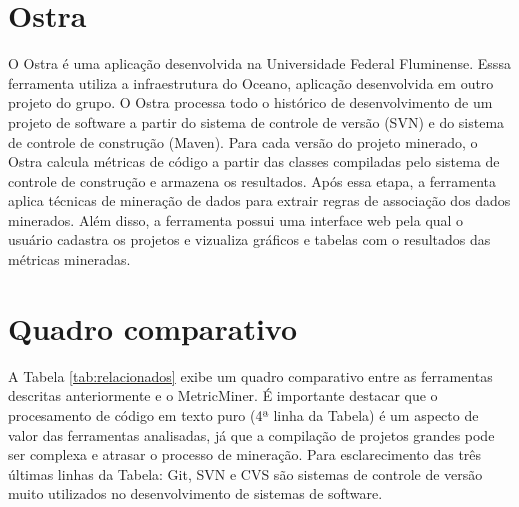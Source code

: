 \documentclass[a4paper, 12pt, twoside]{book}
\begin{document}
\section*{Ostra}
    O Ostra \cite{oceano} é uma aplicação desenvolvida na Universidade Federal Fluminense. Esssa ferramenta utiliza a infraestrutura do Oceano, aplicação desenvolvida em outro projeto do grupo. O Ostra processa todo o histórico de desenvolvimento de um projeto de software a partir do sistema de controle de versão (SVN) e do sistema de controle de construção (Maven). Para cada versão do projeto minerado, o Ostra calcula métricas de código a partir das classes compiladas pelo sistema de controle de construção e armazena os resultados. Após essa etapa, a ferramenta aplica técnicas de mineração de dados para extrair regras de associação dos dados minerados. Além disso, a ferramenta possui uma interface web pela qual o usuário cadastra os projetos e vizualiza gráficos e tabelas com o resultados das métricas mineradas.
    \section{Quadro comparativo}


    A Tabela \ref{tab:relacionados} exibe um quadro comparativo entre as ferramentas descritas anteriormente e o MetricMiner. É importante destacar que o procesamento de código em texto puro (4ª linha da Tabela) é um aspecto de valor das ferramentas analisadas, já que a compilação de projetos grandes pode ser complexa e atrasar o processo de mineração. Para esclarecimento das três últimas linhas da Tabela: Git, SVN e CVS são sistemas de controle de versão muito utilizados no desenvolvimento de sistemas de software.
\end{document}
